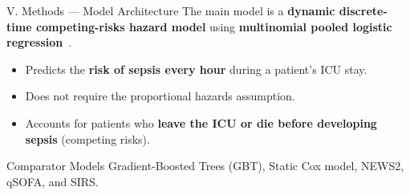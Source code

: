 \begin{frame}{V. Methods --- Model Architecture}
The main model is a \textbf{dynamic discrete-time competing-risks hazard
model} using \textbf{multinomial pooled logistic
regression}~\cite{dagostino1990pooled}.

\vspace{6pt}
\begin{itemize}
  \item Predicts the \textbf{risk of sepsis every hour} during a patient's
        ICU stay.
  \item Does not require the proportional hazards assumption.
  \item Accounts for patients who \textbf{leave the ICU or die before
        developing sepsis} (competing risks).
\end{itemize}

\vspace{8pt}
\begin{exampleblock}{Comparator Models}
Gradient-Boosted Trees (GBT), Static Cox model, NEWS2, qSOFA, and SIRS.
\end{exampleblock}
\end{frame}


